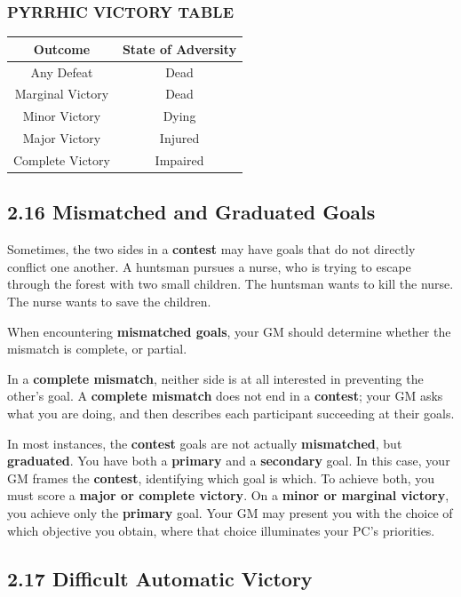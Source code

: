 \documentclass[
]{article}
\begin{document}
\hypertarget{pyrrhic-victory-table}{%
\subsubsection{PYRRHIC VICTORY TABLE}\label{pyrrhic-victory-table}}

\begin{longtable}[]{@{}cc@{}}
\toprule
Outcome & State of Adversity\tabularnewline
\midrule
\endhead
Any Defeat & Dead\tabularnewline
Marginal Victory & Dead\tabularnewline
Minor Victory & Dying\tabularnewline
Major Victory & Injured\tabularnewline
Complete Victory & Impaired\tabularnewline
\bottomrule
\end{longtable}

\hypertarget{mismatched-and-graduated-goals}{%
\subsection{2.16 Mismatched and Graduated
Goals}\label{mismatched-and-graduated-goals}}

Sometimes, the two sides in a \textbf{contest} may have goals that do
not directly conflict one another. A huntsman pursues a nurse, who is
trying to escape through the forest with two small children. The
huntsman wants to kill the nurse. The nurse wants to save the children.

When encountering \textbf{mismatched goals}, your GM should determine
whether the mismatch is complete, or partial.

In a \textbf{complete mismatch}, neither side is at all interested in
preventing the other's goal. A \textbf{complete mismatch} does not end
in a \textbf{contest}; your GM asks what you are doing, and then
describes each participant succeeding at their goals.

In most instances, the \textbf{contest} goals are not actually
\textbf{mismatched}, but \textbf{graduated}. You have both a
\textbf{primary} and a \textbf{secondary} goal. In this case, your GM
frames the \textbf{contest}, identifying which goal is which. To achieve
both, you must score a \textbf{major or complete victory}. On a
\textbf{minor or marginal victory}, you achieve only the
\textbf{primary} goal. Your GM may present you with the choice of which
objective you obtain, where that choice illuminates your PC's
priorities.

\hypertarget{difficult-automatic-victory}{%
\subsection{2.17 Difficult Automatic
Victory}\label{difficult-automatic-victory}}
\end{document}
